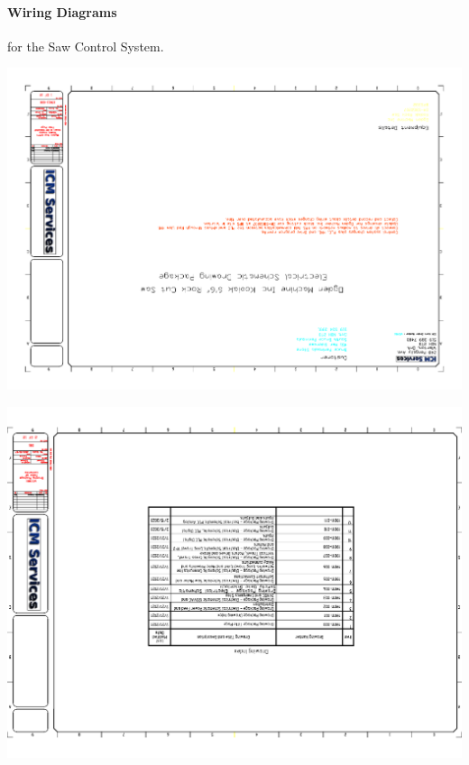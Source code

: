 \paragraph*{Wiring Diagrams}for the Saw Control System.
\begin{center}
	\includegraphics[width=7.5in,angle=90]{../DRAWINGS/19011-000.pdf}
	\label{schem:cover} %
\end{center}
\begin{center}
	\includegraphics[width=7.5in,angle=90]{../DRAWINGS/19011-001.pdf}
	\label{schem:toc} %
\end{center}

